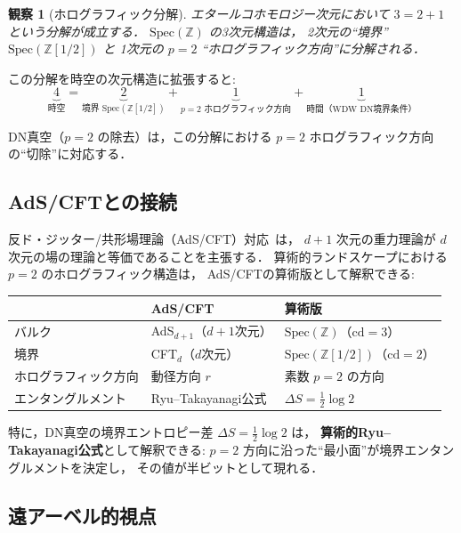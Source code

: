 \documentclass[11pt,a4paper]{article}
\newtheorem{observation}{観察}
\begin{document}
\begin{observation}[ホログラフィック分解]
エタールコホモロジー次元において
$3 = 2 + 1$ という分解が成立する．
$\mathrm{Spec}(\mathbb{Z})$ の3次元構造は，
2次元の``境界'' $\mathrm{Spec}(\mathbb{Z}[1/2])$ と
1次元の $p = 2$ ``ホログラフィック方向''に分解される．
\end{observation}

この分解を時空の次元構造に拡張すると:
\begin{equation}
\underbrace{4}_{\text{時空}} =
\underbrace{2}_{\text{境界 } \mathrm{Spec}(\mathbb{Z}[1/2])}
+ \underbrace{1}_{p=2 \text{ ホログラフィック方向}}
+ \underbrace{1}_{\text{時間（WDW DN境界条件）}}
\end{equation}

DN真空（$p = 2$ の除去）は，この分解における
$p = 2$ ホログラフィック方向の``切除''に対応する．

\subsection{AdS/CFTとの接続}

反ド・ジッター/共形場理論（AdS/CFT）対応~\cite{Maldacena1999}は，
$d+1$ 次元の重力理論が $d$ 次元の場の理論と等価であることを主張する．
算術的ランドスケープにおける $p = 2$ のホログラフィック構造は，
AdS/CFTの算術版として解釈できる:

\begin{center}
\begin{tabular}{lll}
\toprule
& \textbf{AdS/CFT} & \textbf{算術版} \\
\midrule
バルク & AdS$_{d+1}$（$d+1$次元） & $\mathrm{Spec}(\mathbb{Z})$（$\mathrm{cd} = 3$）\\
境界 & CFT$_d$（$d$次元） & $\mathrm{Spec}(\mathbb{Z}[1/2])$（$\mathrm{cd} = 2$）\\
ホログラフィック方向 & 動径方向 $r$ & 素数 $p = 2$ の方向 \\
エンタングルメント & Ryu--Takayanagi公式 & $\Delta S = \frac{1}{2}\log 2$ \\
\bottomrule
\end{tabular}
\end{center}

特に，DN真空の境界エントロピー差
$\Delta S = \frac{1}{2}\log 2$ は，
\textbf{算術的Ryu--Takayanagi公式}として解釈できる:
$p = 2$ 方向に沿った``最小面''が境界エンタングルメントを決定し，
その値が半ビットとして現れる．

\subsection{遠アーベル的視点}
\end{document}
